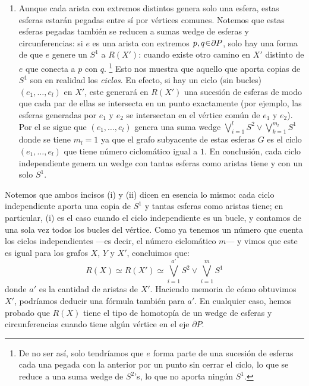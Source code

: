 \begin{sol}
\begin{enumerate}[leftmargin=*]
\begin{enumerate}[leftmargin=1.2em, label=(\roman*)]
    \item Aunque cada arista con extremos distintos genera solo una esfera, estas esferas estarán pegadas entre sí por vértices comunes. Notemos que estas esferas pegadas también se reducen a sumas wedge de esferas y circunferencias: si $e$ es una arista con extremos $p,q\en \partial P$, solo hay una forma de que $e$ genere un $S^1$ a $R(X')$: cuando existe otro camino en $X'$ distinto de $e$ que conecta a $p$ con $q$.%
    \footnote{
        De no ser así, solo tendríamos que $e$ forma parte de una sucesión de esferas cada una pegada con la anterior por un punto sin cerrar el ciclo, lo que se reduce a una suma wedge de $S^2$'s, lo que no aporta ningún $S^1$.
    } %
    Esto nos muestra que aquello que aporta copias de $S^1$ son en realidad los \emph{ciclos}. En efecto, si hay un ciclo (sin bucles) $(e_1,\dots,e_l)$ en $X'$, este generará en $R(X')$ una sucesión de esferas de modo que cada par de ellas se intersecta en un punto exactamente (por ejemplo, las esferas generadas por $e_1$ y $e_2$ se intersectan en el vértice común de $e_1$ y $e_2$). Por el  se sigue que $(e_1,\dots,e_l)$ genera una suma wedge $\bigvee_{i=1}^l S^2 \vee \bigvee_{k=1}^{m_l} S^1$ donde se tiene $m_l= 1$ ya que el grafo subyacente de estas esferas $G$ es el ciclo $(e_1,\dots,e_l)$ que tiene número ciclomático igual a $1$. En conclusión, cada ciclo independiente genera un wedge con tantas esferas como aristas tiene y con un solo $S^1$.
    \end{enumerate}
Notemos que ambos incisos (i) y (ii) dicen en esencia lo mismo: cada ciclo independiente aporta una copia de $S^1$ y tantas esferas como aristas tiene; en particular, (i) es el caso cuando el ciclo independiente es un bucle, y contamos de una sola vez todos los bucles del vértice. Como ya tenemos un número que cuenta los ciclos independientes ---es decir, el número ciclomático $m$--- y vimos que este es igual para los grafos $X$, $Y$ y $X'$, concluimos que:
\[
R(X) \simeq R(X') \simeq \bigvee^{a'}_{i=1} S^2 \vee \bigvee^m_{i=1}S^1
\]
donde $a'$ es la cantidad de aristas de $X'$. Haciendo memoria de cómo obtuvimos $X'$, podríamos deducir una fórmula también para $a'$. En cualquier caso, hemos probado que $R(X)$ tiene el tipo de homotopía de un wedge de esferas y circunferencias cuando tiene algún vértice en el eje $\partial P$.
\end{enumerate}
\end{sol}

